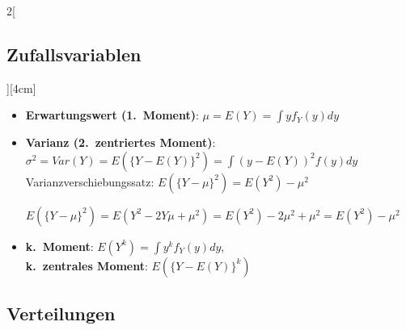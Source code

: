 \documentclass[8pt]{extarticle}
\begin{document}
\begin{multicols}{2}[\subsection{Zufallsvariablen}][4cm]
\begin{itemize}
\item \textbf{Erwartungswert (1.\ Moment)}: $\mu = E(Y) = \int y f_Y(y)dy$
\item \textbf{Varianz (2.\ zentriertes Moment)}: $\sigma^2 = Var(Y) = E(\{Y-E(Y)\}^2) = \int (y - E(Y))^2 f(y) dy$ \\
Varianzverschiebungssatz: $E(\{Y-\mu\}^2) = E(Y^2) - \mu^2$
\begin{Beweis}
$E(\{Y-\mu\}^2) = E(Y^2 - 2Y\mu + \mu^2) = E(Y^2) - 2\mu^2 + \mu^2 = E(Y^2) - \mu^2$
\end{Beweis}
\item \textbf{k.\ Moment}: $E(Y^k) = \int y^k f_Y(y) dy$,\\ \textbf{k.\ zentrales Moment}: $E(\{Y-E(Y)\}^k)$
\end{itemize}
  
\end{multicols}

\subsection{Verteilungen}
\end{document}
